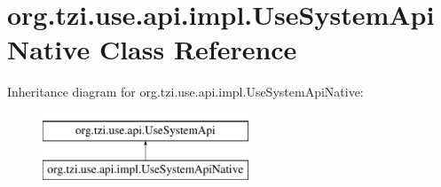 \hypertarget{classorg_1_1tzi_1_1use_1_1api_1_1impl_1_1_use_system_api_native}{\section{org.\-tzi.\-use.\-api.\-impl.\-Use\-System\-Api\-Native Class Reference}
\label{classorg_1_1tzi_1_1use_1_1api_1_1impl_1_1_use_system_api_native}
}
Inheritance diagram for org.\-tzi.\-use.\-api.\-impl.\-Use\-System\-Api\-Native\-:\begin{figure}[H]
\begin{center}
\leavevmode
\includegraphics[height=2.000000cm]{classorg_1_1tzi_1_1use_1_1api_1_1impl_1_1_use_system_api_native}
\end{center}
\end{figure}
